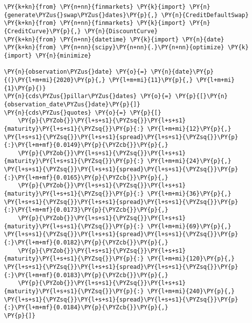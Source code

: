 \begin{Answer}
\begin{tcolorbox}[size=fbox, boxrule=1pt, pad at break*=1mm,colback=cellbackground, colframe=cellborder]
\begin{Verbatim}[commandchars=\\\{\}]
\PY{k+kn}{from} \PY{n+nn}{finmarkets} \PY{k}{import} \PY{n}{generate\PYZus{}swap\PYZus{}dates}\PY{p}{,} \PY{n}{CreditDefaultSwap}
\PY{k+kn}{from} \PY{n+nn}{finmarkets} \PY{k}{import} \PY{n}{CreditCurve}\PY{p}{,} \PY{n}{DiscountCurve}
\PY{k+kn}{from} \PY{n+nn}{datetime} \PY{k}{import} \PY{n}{date}
\PY{k+kn}{from} \PY{n+nn}{scipy}\PY{n+nn}{.}\PY{n+nn}{optimize} \PY{k}{import} \PY{n}{minimize}

\PY{n}{observation\PYZus{}date} \PY{o}{=} \PY{n}{date}\PY{p}{(}\PY{l+m+mi}{2020}\PY{p}{,} \PY{l+m+mi}{11}\PY{p}{,} \PY{l+m+mi}{1}\PY{p}{)}
\PY{n}{cds\PYZus{}pillar\PYZus{}dates} \PY{o}{=} \PY{p}{[}\PY{n}{observation_date\PYZus{}date}\PY{p}{]}
\PY{n}{cds\PYZus{}quotes} \PY{o}{=} \PY{p}{[}
    \PY{p}{\PYZob{}}\PY{l+s+s1}{\PYZsq{}}\PY{l+s+s1}{maturity}\PY{l+s+s1}{\PYZsq{}}\PY{p}{:} \PY{l+m+mi}{12}\PY{p}{,} \PY{l+s+s1}{\PYZsq{}}\PY{l+s+s1}{spread}\PY{l+s+s1}{\PYZsq{}}\PY{p}{:}\PY{l+m+mf}{0.0149}\PY{p}{\PYZcb{}}\PY{p}{,}
    \PY{p}{\PYZob{}}\PY{l+s+s1}{\PYZsq{}}\PY{l+s+s1}{maturity}\PY{l+s+s1}{\PYZsq{}}\PY{p}{:} \PY{l+m+mi}{24}\PY{p}{,} \PY{l+s+s1}{\PYZsq{}}\PY{l+s+s1}{spread}\PY{l+s+s1}{\PYZsq{}}\PY{p}{:}\PY{l+m+mf}{0.0165}\PY{p}{\PYZcb{}}\PY{p}{,}
    \PY{p}{\PYZob{}}\PY{l+s+s1}{\PYZsq{}}\PY{l+s+s1}{maturity}\PY{l+s+s1}{\PYZsq{}}\PY{p}{:} \PY{l+m+mi}{36}\PY{p}{,} \PY{l+s+s1}{\PYZsq{}}\PY{l+s+s1}{spread}\PY{l+s+s1}{\PYZsq{}}\PY{p}{:}\PY{l+m+mf}{0.0173}\PY{p}{\PYZcb{}}\PY{p}{,}
    \PY{p}{\PYZob{}}\PY{l+s+s1}{\PYZsq{}}\PY{l+s+s1}{maturity}\PY{l+s+s1}{\PYZsq{}}\PY{p}{:} \PY{l+m+mi}{69}\PY{p}{,} \PY{l+s+s1}{\PYZsq{}}\PY{l+s+s1}{spread}\PY{l+s+s1}{\PYZsq{}}\PY{p}{:}\PY{l+m+mf}{0.0182}\PY{p}{\PYZcb{}}\PY{p}{,}
    \PY{p}{\PYZob{}}\PY{l+s+s1}{\PYZsq{}}\PY{l+s+s1}{maturity}\PY{l+s+s1}{\PYZsq{}}\PY{p}{:} \PY{l+m+mi}{120}\PY{p}{,} \PY{l+s+s1}{\PYZsq{}}\PY{l+s+s1}{spread}\PY{l+s+s1}{\PYZsq{}}\PY{p}{:}\PY{l+m+mf}{0.0183}\PY{p}{\PYZcb{}}\PY{p}{,}
    \PY{p}{\PYZob{}}\PY{l+s+s1}{\PYZsq{}}\PY{l+s+s1}{maturity}\PY{l+s+s1}{\PYZsq{}}\PY{p}{:} \PY{l+m+mi}{240}\PY{p}{,} \PY{l+s+s1}{\PYZsq{}}\PY{l+s+s1}{spread}\PY{l+s+s1}{\PYZsq{}}\PY{p}{:}\PY{l+m+mf}{0.0184}\PY{p}{\PYZcb{}}\PY{p}{,}
\PY{p}{]}


\end{Verbatim}
\end{tcolorbox}
\end{Answer}
